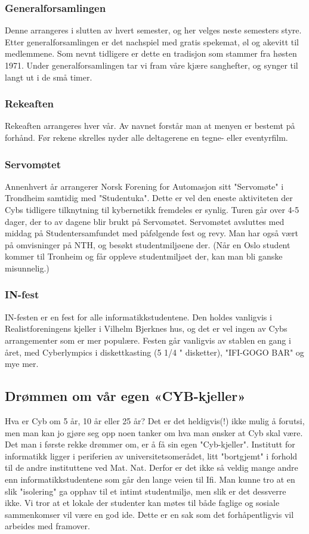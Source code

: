 \documentclass[../main.tex]{subfiles}
\begin{document}
\subsubsection{Generalforsamlingen}
Denne arrangeres i slutten av hvert semester, og her velges neste semesters styre. Etter generalforsamlingen er det nachspiel med gratis spekemat, øl og akevitt til medlemmene. Som nevnt tidligere er dette en tradisjon som stammer fra høsten 1971. Under generalforsamlingen tar vi fram våre kjære sanghefter, og synger til langt ut i de små timer.

\subsubsection{Rekeaften}
Rekeaften arrangeres hver vår. Av navnet forstår man at menyen er bestemt på forhånd. Før rekene skrelles nyder alle deltagerene en tegne- eller eventyrfilm.

\subsubsection{Servomøtet}
Annenhvert år arrangerer Norsk Forening for Automasjon sitt "Servomøte" i Trondheim samtidig med "Studentuka". Dette er vel den eneste aktiviteten der Cybs tidligere tilknytning til kybernetikk fremdeles er synlig. Turen går over 4-5 dager, der to av dagene blir brukt på Servomøtet. Servomøtet avsluttes med middag på Studentersamfundet med påfølgende fest og revy. Man har også vært på omvisninger på NTH, og besøkt studentmiljøene der. (Når en Oslo student kommer til Tronheim og får oppleve studentmiljøet der, kan man bli ganske misunnelig.)

\subsubsection{IN-fest}
IN-festen er en fest for alle informatikkstudentene. Den holdes vanligvis i Realistforeningens kjeller i Vilhelm Bjerknes hus, og det er vel ingen av Cybs arrangementer som er mer populære. Festen går vanligvis av stablen en gang i året, med Cyberlympics i diskettkasting (5 1/4 " disketter), "IFI-GOGO BAR" og mye mer.

\subsection{Drømmen om vår egen «CYB-kjeller»}
Hva er Cyb om 5 år, 10 år eller 25 år? Det er det heldigvis(!) ikke mulig å forutsi, men man kan jo gjøre seg opp noen tanker om hva man ønsker at Cyb skal være. Det man i første rekke drømmer om, er å få sin egen "Cyb-kjeller". Institutt for informatikk ligger i periferien av universitetsomerådet, litt "bortgjemt" i forhold til de andre instituttene ved Mat. Nat. Derfor er det ikke så veldig mange andre enn informatikkstudentene som går den lange veien til Ifi. Man kunne tro at en slik "isolering" ga opphav til et intimt studentmiljø, men slik er det dessverre ikke. Vi tror at et lokale der studenter kan møtes til både faglige og sosiale sammenkomser vil være en god ide. Dette er en sak som det forhåpentligvis vil arbeides med framover.
\end{document}
